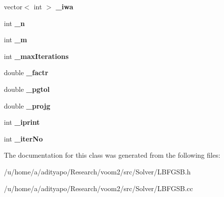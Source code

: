 \begin{DoxyCompactItemize}
\item 
\hypertarget{classvoom_1_1_l_b_f_g_s_b_a502327043d8548b71a77691f2c9e752c}{
vector$<$ int $>$ {\bfseries \_\-iwa}}
\label{classvoom_1_1_l_b_f_g_s_b_a502327043d8548b71a77691f2c9e752c}

\item 
\hypertarget{classvoom_1_1_l_b_f_g_s_b_a21deb6a07f5597430339136cf780c88f}{
int {\bfseries \_\-n}}
\label{classvoom_1_1_l_b_f_g_s_b_a21deb6a07f5597430339136cf780c88f}

\item 
\hypertarget{classvoom_1_1_l_b_f_g_s_b_a42ecdefb7f7e24648bc742846036ea48}{
int {\bfseries \_\-m}}
\label{classvoom_1_1_l_b_f_g_s_b_a42ecdefb7f7e24648bc742846036ea48}

\item 
\hypertarget{classvoom_1_1_l_b_f_g_s_b_a6748820bc5e27c952c6a0ecab9795c74}{
int {\bfseries \_\-maxIterations}}
\label{classvoom_1_1_l_b_f_g_s_b_a6748820bc5e27c952c6a0ecab9795c74}

\item 
\hypertarget{classvoom_1_1_l_b_f_g_s_b_a112a42abaa1091e23c65d221e42e9503}{
double {\bfseries \_\-factr}}
\label{classvoom_1_1_l_b_f_g_s_b_a112a42abaa1091e23c65d221e42e9503}

\item 
\hypertarget{classvoom_1_1_l_b_f_g_s_b_a13d2aec66d42a8ad933290d9a574ade8}{
double {\bfseries \_\-pgtol}}
\label{classvoom_1_1_l_b_f_g_s_b_a13d2aec66d42a8ad933290d9a574ade8}

\item 
\hypertarget{classvoom_1_1_l_b_f_g_s_b_a9e4bf52e5affa003434589d696644e5d}{
double {\bfseries \_\-projg}}
\label{classvoom_1_1_l_b_f_g_s_b_a9e4bf52e5affa003434589d696644e5d}

\item 
\hypertarget{classvoom_1_1_l_b_f_g_s_b_a2d7eb532eea25e7675e2866c27f30c8b}{
int {\bfseries \_\-iprint}}
\label{classvoom_1_1_l_b_f_g_s_b_a2d7eb532eea25e7675e2866c27f30c8b}

\item 
\hypertarget{classvoom_1_1_l_b_f_g_s_b_a7babc694ce25cd8fea76f223ef2b4914}{
int {\bfseries \_\-iterNo}}
\label{classvoom_1_1_l_b_f_g_s_b_a7babc694ce25cd8fea76f223ef2b4914}

\end{DoxyCompactItemize}


The documentation for this class was generated from the following files:\begin{DoxyCompactItemize}
\item 
/u/home/a/adityapo/Research/voom2/src/Solver/LBFGSB.h\item 
/u/home/a/adityapo/Research/voom2/src/Solver/LBFGSB.cc\end{DoxyCompactItemize}
